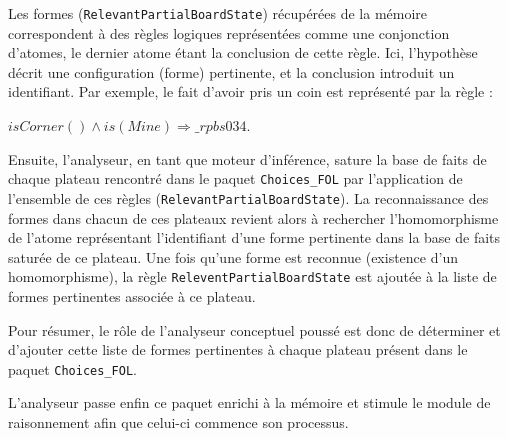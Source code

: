 Les formes (\texttt{RelevantPartialBoardState}) récupérées de la mémoire correspondent à des règles logiques représentées comme une conjonction d'atomes, le dernier atome étant la conclusion de cette règle. Ici, l'hypothèse décrit une configuration (forme) pertinente, et la conclusion introduit un identifiant. Par exemple, le fait d'avoir pris un coin est représenté par la règle :

\textit{$isCorner() \wedge is(Mine) \Longrightarrow \_rpbs034$}. 

Ensuite, l'analyseur, en tant que moteur d'inférence, sature la base de faits de chaque plateau rencontré dans le paquet \texttt{Choices\_FOL} par l'application de l'ensemble de ces règles (\texttt{RelevantPartialBoardState}). La reconnaissance des formes dans chacun de ces plateaux revient alors à rechercher l'homomorphisme de l'atome représentant l'identifiant d'une forme pertinente dans la base de faits saturée de ce plateau. Une fois qu'une forme est reconnue (existence d'un homomorphisme), la règle \texttt{ReleventPartialBoardState} est ajoutée à la liste de formes pertinentes associée à ce plateau.

Pour résumer, le rôle de l'analyseur conceptuel poussé est donc de déterminer et d'ajouter cette liste de formes pertinentes à chaque plateau présent dans le paquet \texttt{Choices\_FOL}. 

L'analyseur passe enfin ce paquet enrichi à la mémoire et stimule le module de raisonnement afin que celui-ci commence son processus. 